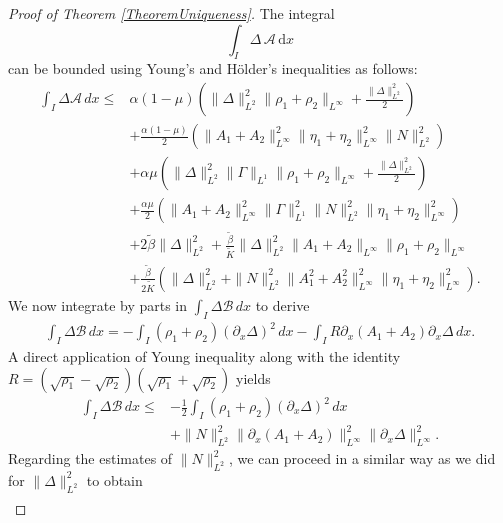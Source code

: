 \documentclass[12pt]{amsart}
\newcommand{\D}{\,d}
\begin{document}
\begin{proof}[Proof of Theorem \ref{TheoremUniqueness}]
	The integral
\[
\int_I \Delta\,\mathcal{A}\,\mathrm{d}x
\]
can be bounded using Young’s and Hölder’s inequalities as follows:
	\begin{equation*}
		\begin{split} 
			\int_I \Delta\mathcal{A}\D x\leq& \alpha(1-\mu)\left(\|\Delta\|_{L^2}^2\|\rho_1+\rho_2\|_{L^\infty}+\frac{\|\Delta\|_{L^2}^2}{2}\right)\\
			&+\frac{\alpha(1-\mu)}{2}(\|A_1+A_2\|_{L^\infty}^2\|\eta_1+\eta_2\|_{L^\infty}^2\|N\|_{L^2}^2)\\
			&+\alpha\mu\left( \|\Delta\|_{L^2}^2\|\Gamma\|_{L^1}\|\rho_1+\rho_2\|_{L^\infty}+\frac{\|\Delta\|_{L^2}^2}{2}\right)\\
			&+\frac{\alpha\mu}{2}(\|A_1+A_2\|_{L^\infty}^2\|\Gamma\|_{L^1}^2\|N\|_{L^2}^2\|\eta_1+\eta_2\|_{L^\infty}^2)\\
			&+2\widetilde{\beta}\|\Delta\|_{L^2}^2+\frac{\widetilde{\beta}}{\widetilde{K}}\|\Delta\|_{L^2}^2\|A_1+A_2\|_{L^\infty}\|\rho_1+\rho_2\|_{L^\infty}\\
			&+\frac{\widetilde{\beta}}{2\widetilde{K}}\left( \|\Delta\|_{L^2}^2+ \|N\|_{L^2}^2\|A_1^2+A_2^2\|_{L^\infty}^2\|\eta_1+\eta_2\|_{L^\infty}^2  \right).
		\end{split}
	\end{equation*}
	We now integrate by parts in $\int_I \Delta\mathcal{B} \D x$ to derive
	\begin{equation*}
		\begin{split}
			\int_I \Delta\mathcal{B}\D x= -\int_I (\rho_1+\rho_2)(\partial_x \Delta)^2\D x-\int_I R\partial_x(A_1+A_2)\partial_x\Delta \D x.
		\end{split}
	\end{equation*}
	A direct application of Young inequality along with the identity $R=(\sqrt{\rho_1}-\sqrt{\rho_2})(\sqrt{\rho_1}+\sqrt{\rho_2})$ yields
	\begin{equation*}
		\begin{split}
			\int_I \Delta\mathcal{B} \D x\leq& -\frac{1}{2}\int_I(\rho_1+\rho_2)(\partial_x \Delta)^2 \D x\\
            &+ \|N\|_{L^2}^2\|\partial_x(A_1+A_2)\|_{L^\infty}^2\|\partial_x\Delta\|_{L^\infty}^2.
		\end{split}
	\end{equation*}
	Regarding the estimates  of $\|N\|_{L^2}^2$, we can proceed in a similar way as we did for $\|\Delta\|_{L^2}^2$ to obtain
	\begin{equation*}
		\begin{split}

\end{split}
\end{equation*}
\end{proof}
\end{document}
